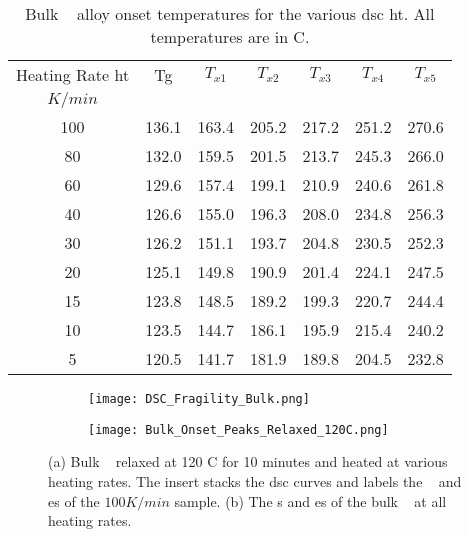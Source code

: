 \documentclass[a4paper,12pt,oneside]{article}%
\begin{document}
\begin{table}[h]
	\centering
	\begin{tabular}{ c c c c c c c }
		\toprule
		Heating Rate \acrshort{ht} & \acrshort{Tg} & $T_{x1}$ & $T_{x2}$ & $T_{x3}$ & $T_{x4}$ & $T_{x5}$ \\ 
		$K/min$ & & & & & & \\
		\midrule
		100 & 136.1 & 163.4 & 205.2 & 217.2 & 251.2 & 270.6 \\ 
		80 & 132.0 & 159.5 & 201.5 & 213.7 & 245.3 & 266.0 \\ 
		60 & 129.6 & 157.4 & 199.1 & 210.9 & 240.6 & 261.8 \\ 
		40 & 126.6 & 155.0 & 196.3 & 208.0 & 234.8 & 256.3 \\ 
		30 & 126.2 & 151.1 & 193.7 & 204.8 & 230.5 & 252.3 \\ 
		20 & 125.1 & 149.8 & 190.9 & 201.4 & 224.1 & 247.5 \\ 
		15 & 123.8 & 148.5 & 189.2 & 199.3 & 220.7 & 244.4 \\ 
		10 & 123.5 & 144.7 & 186.1 & 195.9 & 215.4 & 240.2 \\ 
		5 & 120.5 & 141.7 & 181.9 & 189.8 & 204.5 & 232.8 \\ 
		\bottomrule
	\end{tabular}
	\caption{Bulk \MgZnCa~ alloy onset temperatures for the various \acrshort{dsc}  \acrshort{ht}. All temperatures are in \degree C.}
	\label{tab:BulkOnsets}
\end{table}

\begin{figure}[b]
	\centering
	\begin{subfigure}[htbp]{0.495\textwidth}
		\texttt{[image: DSC\_Fragility\_Bulk.png]}
		\caption{}
		\label{fig:DSC_vHeatingRate_Bulk}
	\end{subfigure}
	\begin{subfigure}[htbp]{0.495\textwidth}
		\texttt{[image: Bulk\_Onset\_Peaks\_Relaxed\_120C.png]}
		\caption{}
		\label{fig:DSC_Onsets_Bulk}
	\end{subfigure}
	\caption{(a) Bulk \MgZnCa~ relaxed at 120 \degree C for 10 minutes and heated at various heating rates. The insert stacks the \gls{dsc} curves and labels the \Tg~ and \Tx es of the $100 K/min$ sample. (b) The \Tg s and \Tx es of the bulk \MgZnCa~ at all heating rates. }%
	\label{fig:DSC_Bulk}
\end{figure}
\end{document}
